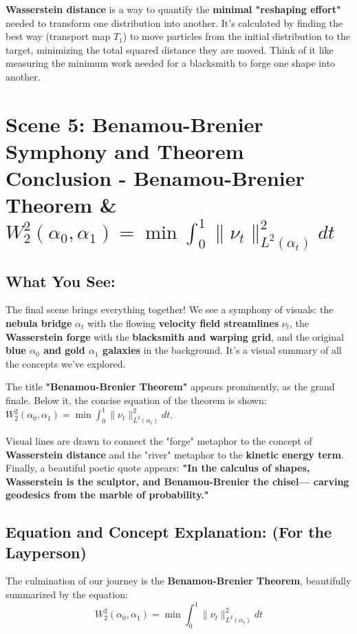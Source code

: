 \documentclass{article}
\begin{document}
\textbf{Wasserstein distance} is a way to quantify the \textbf{minimal "reshaping effort"} needed to transform one distribution into another. It's calculated by finding the best way (transport map \( T_1 \)) to move particles from the initial distribution to the target, minimizing the total squared distance they are moved.  Think of it like measuring the minimum work needed for a blacksmith to forge one shape into another.

\hrulefill

\section*{Scene 5: Benamou-Brenier Symphony and Theorem Conclusion -  Benamou-Brenier Theorem \&  \( W_2^2(\alpha_0, \alpha_1) = \min \int_0^1 \|\nu_t\|_{L^2(\alpha_t)}^2 dt \)}

\subsection*{What You See:}

The final scene brings everything together! We see a symphony of visuals: the \textbf{nebula bridge} \( \alpha_t \) with the flowing \textbf{velocity field streamlines} \( \nu_t \), the \textbf{Wasserstein forge} with the \textbf{blacksmith and warping grid}, and the original \textbf{blue \( \alpha_0 \) and gold \( \alpha_1 \) galaxies} in the background.  It's a visual summary of all the concepts we've explored.

The title \textbf{"Benamou-Brenier Theorem"} appears prominently, as the grand finale. Below it, the concise equation of the theorem is shown: \( W_2^2(\alpha_0, \alpha_1) = \min \int_0^1 \|\nu_t\|_{L^2(\alpha_t)}^2 dt \).

Visual lines are drawn to connect the "forge" metaphor to the concept of \textbf{Wasserstein distance} and the "river" metaphor to the \textbf{kinetic energy term}.  Finally, a beautiful poetic quote appears: \textbf{"In the calculus of shapes, Wasserstein is the sculptor, and Benamou-Brenier the chisel--- carving geodesics from the marble of probability."}

\subsection*{Equation and Concept Explanation: (For the Layperson)}

The culmination of our journey is the \textbf{Benamou-Brenier Theorem}, beautifully summarized by the equation:
\[
W_2^2(\alpha_0, \alpha_1) = \min \int_0^1 \|\nu_t\|_{L^2(\alpha_t)}^2 dt
\]
\end{document}
